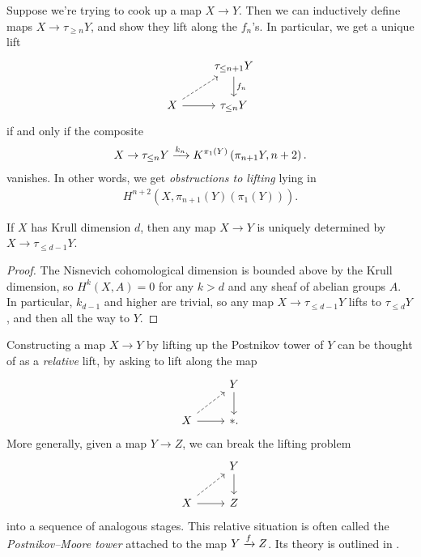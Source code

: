 \documentclass[11pt,openany]{book}
\begin{document}
\begin{example} Suppose we're trying to cook up a map $X \to Y$. Then we can inductively define maps $X \to \tau_{\ge n}Y$, and show they lift along the $f_n$'s. In particular, we get a unique lift
\[ \begin{tikzcd}
     & \tau_{\le n+1}Y\dar["f_n" right]\\
    X\rar\ar[ur,dashed] & \tau_{\le n}Y
\end{tikzcd} \]
if and only if the composite
\begin{align*}
    X \to \tau_{\le n}Y \xrightarrow{k_n} K^{\pi_1(Y)}\left( \pi_{n+1}Y, n+2 \right).
\end{align*}
vanishes. In other words, we get \textit{obstructions to lifting} lying in
\begin{align*}
    H^{n+2}(X, \pi_{n+1}(Y) \left( \pi_1(Y) \right)).
\end{align*}
\end{example}


\begin{theorem} If $X$ has Krull dimension $d$, then any map $X \to Y$ is uniquely determined by $X \to \tau_{\le d-1}Y$.
\end{theorem}
\begin{proof} The Nisnevich cohomological dimension is bounded above by the Krull dimension, so $H^{k}(X,A) = 0$ for any $k>d$ and any sheaf of abelian groups $A$. In particular, $k_{d-1}$ and higher are trivial, so any map $X \to \tau_{\le d-1} Y$ lifts to $\tau_{\le d} Y$, and then all the way to $Y$.
\end{proof}




\begin{remark} Constructing a map $X \to Y$ by lifting up the Postnikov tower of $Y$ can be thought of as a \textit{relative} lift, by asking to lift along the map
\[\begin{tikzcd}
     & Y\dar\\
    X\rar\ar[ur,dashed] & \ast.
\end{tikzcd} \]
More generally, given a map $Y \to Z$, we can break the lifting problem
\[ \begin{tikzcd}
     & Y\dar\\
    X\rar\ar[ur,dashed] & Z
\end{tikzcd} \]
into a sequence of analogous stages. This relative situation is often called the \textit{Postnikov--Moore tower} attached to the map $Y \xrightarrow{f} Z$. Its theory is outlined in \cite[\S B]{Morel}.
\end{remark}
\end{document}
